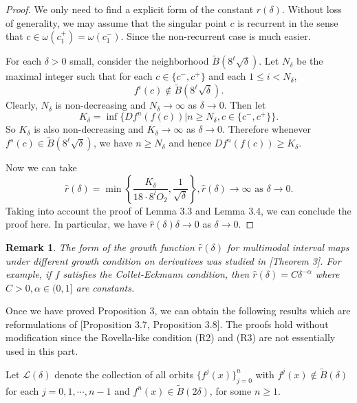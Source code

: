 \documentclass[11pt,oneside]{article}
\theoremstyle{plain}
\newtheorem{remark}{Remark}
\numberwithin{equation}{section}
\numberwithin{figure}{section}
\numberwithin{table}{section}
\begin{document}
\begin{proof}


We only need to find a explicit form of the constant $\hat r(\delta)$. Without loss of generality, we may assume that the singular point $c$ is recurrent in the sense that $c \in \omega(c_1^+) = \omega(c_1^-)$. Since the non-recurrent case is much easier. 


For each $\delta>0$ small, consider the neighborhood $\tilde B(8^{\ell} \sqrt \delta)$. Let $N_{\delta}$ be the maximal integer such that for each $c \in \{c^-, c^+ \}$ and each $1 \leq i < N_{\delta}$,
\[
f^{i} (c) \notin \tilde B(8^{\ell} \sqrt \delta).
\]
Clearly, $N_{\delta}$ is non-decreasing and $N_{\delta} \to \infty$ as $\delta \to 0$. Then let 
\[
K_{\delta} = \inf \{ Df^n(f(c)) | n \geq N_{\delta}, c \in \{ c^-, c^+\} \}.
\]
So $K_{\delta}$ is also non-decreasing and $K_{\delta} \to \infty$ as $\delta \to 0$. Therefore whenever $f^s(c) \in \tilde B(8^{\ell} \sqrt \delta)$, we have $n \geq N_{\delta}$ and hence $Df^n(f(c)) \geq K_{\delta}$.

Now we can take 
\[
\hat r(\delta) = \min \left\{\frac{K_{\delta}}{18 \cdot 8^l O_2}, \frac{1}{\sqrt{\delta}} \right\}, \hat r(\delta) \to \infty \mbox{ as \ } \delta \to 0.
\] 
Taking into account the proof of Lemma 3.3 and Lemma 3.4, we can conclude the proof here. In particular, we have $\hat r(\delta) \delta \to 0$ as $\delta \to 0$.

\end{proof}


\begin{remark}

The form of the growth function $\hat r(\delta)$ for multimodal interval maps under different growth condition on derivatives was studied in \cite{BRSS}[Theorem 3]. For example, if $f$ satisfies the Collet-Eckmann condition, then $\hat r(\delta) = C \delta^{- \alpha}$ where $C > 0, \alpha \in (0, 1]$ are constants.

\end{remark}


Once we have proved Proposition 3, we can obtain the following results which are reformulations of \cite{LR}[Proposition 3.7, Proposition 3.8]. The proofs hold without modification since the Rovella-like condition (R2) and (R3) are not essentially used in this part.



Let $\mathcal L(\delta)$ denote the collection of all orbits $\{f^j(x) \}_{j=0}^n$ with $f^j(x) \notin \tilde B(\delta)$ for each $j = 0, 1, \cdots, n-1$ and $f^n(x) \in \tilde B(2\delta)$, for some $n \geq 1$.  
\end{document}
